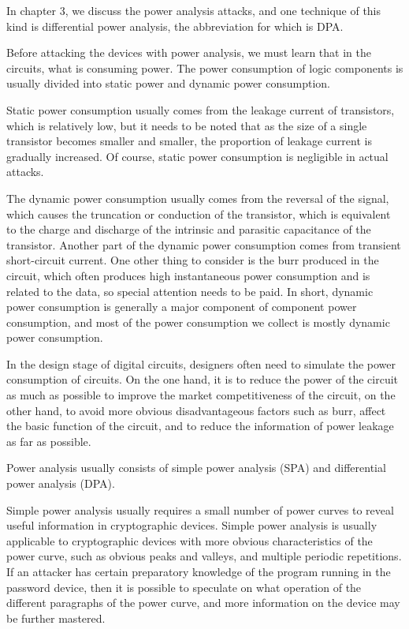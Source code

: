 \begin{bigabstract}
In chapter 3, we discuss the power analysis attacks, and one technique of this kind is differential power analysis, the abbreviation for which is DPA. 

Before attacking the devices with power analysis, we must learn that in the circuits, what is consuming power. The power consumption of logic components is usually divided into static power and dynamic power consumption.

Static power consumption usually comes from the leakage current of transistors, which is relatively low, but it needs to be noted that as the size of a single transistor becomes smaller and smaller, the proportion of leakage current is gradually increased. Of course, static power consumption is negligible in actual attacks.

The dynamic power consumption usually comes from the reversal of the signal, which causes the truncation or conduction of the transistor, which is equivalent to the charge and discharge of the intrinsic and parasitic capacitance of the transistor. Another part of the dynamic power consumption comes from transient short-circuit current. One other thing to consider is the burr produced in the circuit, which often produces high instantaneous power consumption and is related to the data, so special attention needs to be paid. In short, dynamic power consumption is generally a major component of component power consumption, and most of the power consumption we collect is mostly dynamic power consumption.

In the design stage of digital circuits, designers often need to simulate the power consumption of circuits. On the one hand, it is to reduce the power of the circuit as much as possible to improve the market competitiveness of the circuit, on the other hand, to avoid more obvious disadvantageous factors such as burr, affect the basic function of the circuit, and to reduce the information of power leakage as far as possible.

Power analysis usually consists of simple power analysis (SPA) and differential power analysis (DPA).

Simple power analysis usually requires a small number of power curves to reveal useful information in cryptographic devices. Simple power analysis is usually applicable to cryptographic devices with more obvious characteristics of the power curve, such as obvious peaks and valleys, and multiple periodic repetitions. If an attacker has certain preparatory knowledge of the program running in the password device, then it is possible to speculate on what operation of the different paragraphs of the power curve, and more information on the device may be further mastered.


\end{bigabstract}
